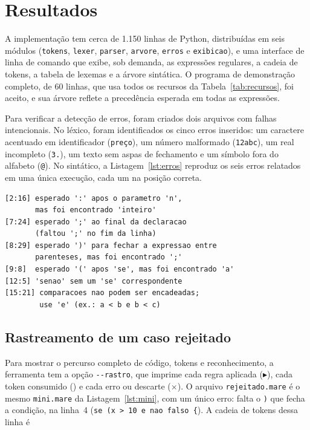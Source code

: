 \documentclass[conference]{IEEEtran}
\begin{document}
\section{Resultados}\label{sec:result}

A implementação tem cerca de 1.150 linhas de Python, distribuídas em seis
módulos (\texttt{tokens}, \texttt{lexer}, \texttt{parser}, \texttt{arvore},
\texttt{erros} e \texttt{exibicao}), e uma interface de linha de comando que
exibe, sob demanda, as expressões regulares, a cadeia de tokens, a tabela de
lexemas e a árvore sintática. O programa de demonstração completo, de 60
linhas, que usa todos os recursos da Tabela~\ref{tab:recursos}, foi aceito, e
sua árvore reflete a precedência esperada em todas as expressões.

Para verificar a detecção de erros, foram criados dois arquivos com falhas
intencionais. No léxico, foram identificados os cinco erros inseridos: um
caractere acentuado em identificador (\texttt{preço}), um número malformado
(\texttt{12abc}), um real incompleto (\texttt{3.}), um texto sem aspas de
fechamento e um símbolo fora do alfabeto (\texttt{@}). No sintático, a
Listagem~\ref{lst:erros} reproduz os seis erros relatados em uma única
execução, cada um na posição correta.

\begin{lstlisting}[style=ebnf,caption={Saída para \texttt{erro\_sintatico.mare} (resumida).},label=lst:erros]
[2:16] esperado ':' apos o parametro 'n',
       mas foi encontrado 'inteiro'
[7:24] esperado ';' ao final da declaracao
       (faltou ';' no fim da linha)
[8:29] esperado ')' para fechar a expressao entre
       parenteses, mas foi encontrado ';'
[9:8]  esperado '(' apos 'se', mas foi encontrado 'a'
[12:5] 'senao' sem um 'se' correspondente
[15:21] comparacoes nao podem ser encadeadas;
        use 'e' (ex.: a < b e b < c)
\end{lstlisting}

\subsection{Rastreamento de um caso rejeitado}
Para mostrar o percurso completo de código, tokens e reconhecimento, a
ferramenta tem a opção \texttt{-{}-rastro}, que imprime cada regra aplicada
($\blacktriangleright$), cada token consumido (\checkmark) e cada erro ou
descarte ($\times$). O arquivo \texttt{rejeitado.mare} é o mesmo
\texttt{mini.mare} da Listagem~\ref{lst:mini}, com um único erro: falta o
\texttt{)} que fecha a condição, na linha~4
(\texttt{se (x > 10 e nao falso \{}). A cadeia de tokens dessa linha é
\end{document}
